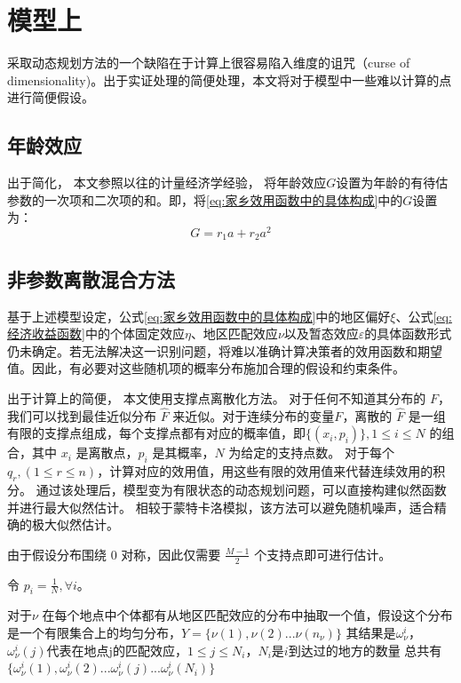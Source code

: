 \documentclass[
  a4paper,
  zihao=-4,
  fontset=mac,
  AutoFakeBold,
  AutoFakeSlant,
  oneside]{ctexbook}
\begin{document}
\section{模型上} 

采取动态规划方法的一个缺陷在于计算上很容易陷入维度的诅咒（curse of dimensionality)。出于实证处理的简便处理，本文将对于模型中一些难以计算的点进行简便假设。

\subsection{年龄效应}
出于简化，
本文参照以往的计量经济学经验，
将年龄效应\(G\)设置为年龄的有待估参数的一次项和二次项的和。即，将\ref{eq:家乡效用函数中的具体构成}中的$G$设置为：
$$G=r_1 a + r_2 a^2$$


\subsection{非参数离散混合方法} 

基于上述模型设定，公式\ref{eq:家乡效用函数中的具体构成}中的地区偏好$\xi$、公式\ref{eq:经济收益函数}中的个体固定效应$\eta$、地区匹配效应$\nu$以及暂态效应$\varepsilon$的具体函数形式仍未确定。若无法解决这一识别问题，将难以准确计算决策者的效用函数和期望值。因此，有必要对这些随机项的概率分布施加合理的假设和约束条件。

出于计算上的简便，
本文使用支撑点离散化方法。
对于任何不知道其分布的 $F$，我们可以找到最佳近似分布 $\hat F$ 来近似。对于连续分布的变量$F$，离散的 $\hat F$ 是一组有限的支撑点组成，每个支撑点都有对应的概率值，即$\{(x_i, p_i)\}, 1 \leqslant i \leqslant N$ 的组合，其中 $x_i$ 是离散点，$p_i$ 是其概率，$N$ 为给定的支持点数。
对于每个$q_r, (1\leqslant r \leqslant n )$，计算对应的效用值，用这些有限的效用值来代替连续效用的积分。
通过该处理后，模型变为有限状态的动态规划问题，可以直接构建似然函数并进行最大似然估计。
相较于蒙特卡洛模拟，该方法可以避免随机噪声，适合精确的极大似然估计。

由于假设分布围绕 0 对称，因此仅需要 $\frac{M-1}{2}$ 个支持点即可进行估计。

令 $p_i = \frac{1}{N}, \forall i$。

对于$\nu$
在每个地点中个体都有从地区匹配效应的分布中抽取一个值，假设这个分布是一个有限集合上的均匀分布，$Y=\{\nu(1),\nu(2)...\nu(n_{\nu})\}$
其结果是$\omega^{i}_{\nu}$，$\omega^{i}_{\nu}(j)$代表在地点j的匹配效应，$1\leqslant j\leqslant N_i$，$N_i$是$i$到达过的地方的数量
总共有$\{\omega^{i}_{\nu}(1),\omega^{i}_{\nu}(2)...\omega^{i}_{\nu}(j)...\omega^{i}_{\nu}(N_i)\}$
\end{document}
